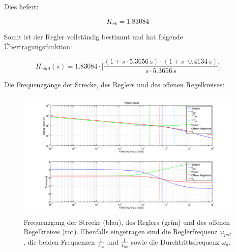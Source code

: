 Dies liefert:

\begin{equation} \label{eq:pid:k_rk_result}
    K_{rk} = 1.83084
\end{equation}

Somit ist der Regler vollst\"andig bestimmt und hat folgende \"Ubertragungsfunktion:

\begin{equation} \label{eq:pid:result}
    H_{rpid}(s) = 1.83084 \cdot \biggl[ \frac{(1 + s \cdot \SI{5.3656}{\second} ) \cdot (1 + s \cdot \SI{0.4134}{\second} ) }{ s \cdot \SI{5.3656}{\second} } \biggr]
\end{equation}

Die Frequenzg\"ange der Strecke, des Reglers und des offenen Regelkreises:

\begin{figure}[h! width=\pagewidth]
    \includegraphics[width=\textwidth]{images/pidCompletePlot.png}
    \caption{%
        Frequenzgang der Strecke (blau), des  Reglers (gr\"un) und des offenen
        Regelkreises  (rot).  Ebenfalls  eingetragen  sind die  Reglerfrequenz
        $\omega_{pid}$,   die   beiden   Frequenzen   $\frac{1}{T_{vk}}$   und
        $\frac{1}{T_{nk}}$ sowie die Durchtrittsfrequenz $\omega_d$.
    }
    \label{fig:pid_complete}
\end{figure}
\clearpage
